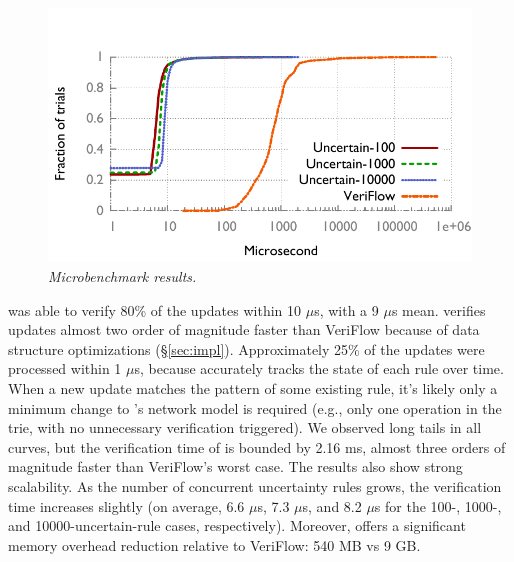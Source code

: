 \begin{figure}[!ht]
  \centering
  \vspace{-0.15in}
  \includegraphics[width=\columnwidth,trim= 0 5mm 0 10mm]{figs/micro}
  \vspace{-0.2in}
  \caption{\em \small Microbenchmark results. }
  \vspace{-0.15in}
  \label{fig:microbench}
\end{figure}

\name was able to verify 80\% of the updates within 10 $\mu$s, with a 9 $\mu$s mean. 
\name verifies updates almost two order of magnitude faster than VeriFlow because of 
data structure optimizations (\S\ref{sec:impl}). 
Approximately 25\% of the updates were processed within 1 $\mu$s, 
because \name accurately tracks the state of each rule over
time. When a new update matches the pattern of some existing rule, it's likely
only a minimum change to \name's network model is required (e.g., only one
operation in the trie, with no unnecessary verification triggered).
We observed long tails in all curves, but the verification time of \name is bounded by 2.16 ms, almost three orders of magnitude faster than VeriFlow's worst case. 
The results also show strong scalability. As the number of concurrent uncertainty rules grows, the verification time increases slightly (on average, 6.6 $\mu$s, 7.3 $\mu$s, and  8.2 $\mu$s for the 100-, 1000-, and 10000-uncertain-rule cases, respectively). Moreover, \name offers a significant memory overhead reduction relative to VeriFlow: 540 MB vs 9 GB.


